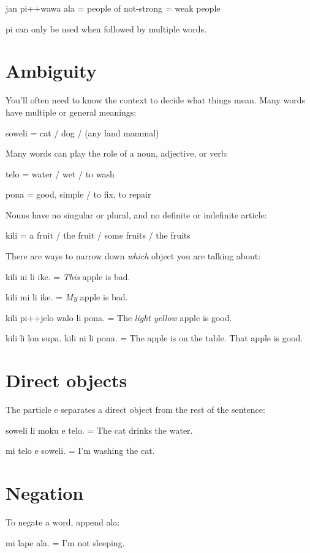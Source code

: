 \documentclass{article}
\begin{document}
\begin{multicols}{2}
\begin{ex}
  {\tpf jan pi++wawa ala} = people of not-strong = weak people
\end{ex}

{\tpf pi} can only be used when followed by multiple words.

\section*{Ambiguity}
You’ll often need to know the context to decide what
things mean.  Many words have multiple or general meanings:
\begin{ex}
  {\tpf soweli} = cat / dog / (any land mammal)
\end{ex}

Many words can play the role of a noun, adjective, or verb:
\begin{ex}
  {\tpf telo} = water / wet / to wash

  {\tpf pona} = good, simple / to fix, to repair
\end{ex}

Nouns have no singular or plural, and no definite or
indefinite article:
\begin{ex}
  {\tpf kili} = a fruit / the fruit / some fruits / the fruits
\end{ex}

There are ways to narrow down \textit{which} object
you are talking about:
\begin{ex}
  {\tpf kili ni li ike}. = \textit{This} apple is bad.

  {\tpf kili mi li ike}. = \textit{My} apple is bad.

  {\tpf kili pi++jelo walo li pona}. = The \textit{light yellow}
  apple is good.

  {\tpf kili li lon supa.  kili ni li pona.} =
  The apple is on the table.  That apple is good.
\end{ex}

\section*{Direct objects}
The particle {\tpf e} separates a direct object from
the rest of the sentence:
\begin{ex}
  {\tpf soweli li moku e telo.} = The cat drinks the water.

  {\tpf mi telo e soweli.} = I’m washing the cat.
\end{ex}

\section*{Negation}
To negate a word, append {\tpf ala}:
\begin{ex}
  {\tpf mi lape ala.} = I'm not sleeping.


\end{ex}
\end{multicols}
\end{document}
